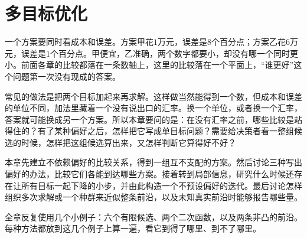 \chapter{多目标优化}
\label{chap:multi-objective-optimization}

一个方案要同时看成本和误差。方案甲花$1$万元，误差是$8$个百分点；方案乙花$6$万元，误差是$1$个百分点。甲便宜，乙准确，两个数字都要小，却没有哪一个同时更小。前面各章的比较都落在一条数轴上，这里的比较落在一个平面上，“谁更好”这个问题第一次没有现成的答案。

常见的做法是把两个目标加起来再求解。这样做当然能得到一个数，但成本和误差的单位不同，加法里藏着一个没有说出口的汇率。换一个单位，或者换一个汇率，答案就可能换成另一个方案。所以本章要问的是：在没有汇率之前，哪些比较是站得住的？有了某种偏好之后，怎样把它写成单目标问题？需要给决策者看一整组候选的时候，怎样把这组候选算出来，又怎样判断它算得好不好？

本章先建立不依赖偏好的比较关系，得到一组互不支配的方案。然后讨论三种写出偏好的办法，比较它们各能到达哪些方案。接着转到局部信息，研究什么时候还存在让所有目标一起下降的小步，并由此构造一个不预设偏好的迭代。最后讨论怎样组织多次求解或一个种群来近似整条前沿，以及未知真实前沿时能够报告哪些量。

全章反复使用几个小例子：六个有限候选、两个二次函数，以及两条非凸的前沿。每种方法都放到这几个例子上算一遍，看它到得了哪里、到不了哪里。









